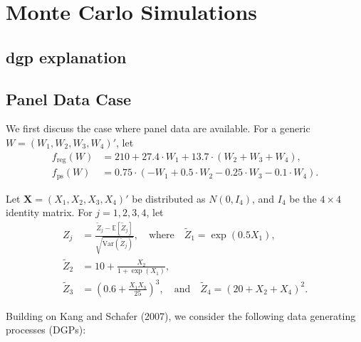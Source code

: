 \section{Monte Carlo Simulations}


\subsection{\ac{dgp} explanation}






\subsection*{Panel Data Case}

We first discuss the case where panel data are available. For a generic $W = (W_1, W_2, W_3, W_4)'$, let
\begin{align*}
    f_{\text{reg}}(W) &= 210 + 27.4 \cdot W_1 + 13.7 \cdot (W_2 + W_3 + W_4), \\
    f_{\text{ps}}(W) &= 0.75 \cdot (-W_1 + 0.5 \cdot W_2 - 0.25 \cdot W_3 - 0.1 \cdot W_4).
\end{align*}

Let $\mathbf{X} = (X_1, X_2, X_3, X_4)'$ be distributed as $N(0, I_4)$, and $I_4$ be the $4 \times 4$ identity matrix. For $j = 1, 2, 3, 4$, let
\begin{align*}
    Z_j &= \frac{\tilde{Z}_j - \mathbb{E}[\tilde{Z}_j]}{\sqrt{\text{Var}(\tilde{Z}_j)}}, \quad \text{where} \quad \tilde{Z}_1 = \exp(0.5X_1), \\
    \tilde{Z}_2 &= 10 + \frac{X_2}{1 + \exp(X_1)}, \\
    \tilde{Z}_3 &= (0.6 + \frac{X_1 X_3}{25})^3, \quad \text{and} \quad \tilde{Z}_4 = (20 + X_2 + X_4)^2.
\end{align*}

Building on Kang and Schafer (2007), we consider the following data generating processes (DGPs):

